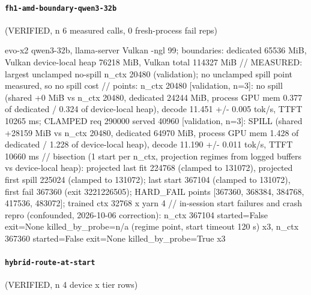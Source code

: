 \paragraph{\texttt{fh1-amd-boundary-qwen3-32b}} (VERIFIED, n 6 measured calls, 0 fresh-process fail reps)

{\footnotesize\raggedright evo-x2 qwen3-32b, llama-server Vulkan -ngl 99; boundaries: dedicated 65536 MiB, Vulkan device-local heap 76218 MiB, Vulkan total 114327 MiB // MEASURED: largest unclamped no-spill n\_ctx 20480 (validation); no unclamped spill point measured, so no spill cost // points: n\_ctx 20480 [validation, n=3]: no spill (shared +0 MiB vs n\_ctx 20480, dedicated 24244 MiB, process GPU mem 0.377 of dedicated / 0.324 of device-local heap), decode 11.451 +/- 0.005 tok/s, TTFT 10265 ms; CLAMPED req 290000 served 40960 [validation, n=3]: SPILL (shared +28159 MiB vs n\_ctx 20480, dedicated 64970 MiB, process GPU mem 1.428 of dedicated / 1.228 of device-local heap), decode 11.190 +/- 0.011 tok/s, TTFT 10660 ms // bisection (1 start per n\_ctx, projection regimes from logged buffers vs device-local heap): projected last fit 224768 (clamped to 131072), projected first spill 225024 (clamped to 131072); last start 367104 (clamped to 131072), first fail 367360 (exit 3221226505); HARD\_FAIL points [367360, 368384, 384768, 417536, 483072]; trained ctx 32768 x yarn 4 // in-session start failures and crash repro (confounded, 2026-10-06 correction): n\_ctx 367104 started=False exit=None killed\_by\_probe=n/a (regime point, start timeout 120 s) x3, n\_ctx 367360 started=False exit=None killed\_by\_probe=True x3\par}

\paragraph{\texttt{hybrid-route-at-start}} (VERIFIED, n 4 device x tier rows)

